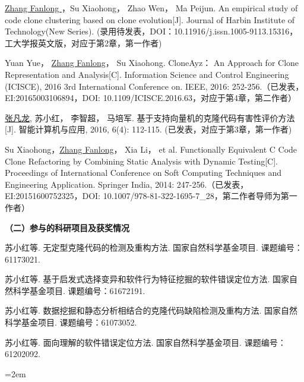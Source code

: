 \begin{publist}
\item
\underline{Zhang Fanlong }，Su Xiaohong， Zhao Wen， Ma Peijun. An empirical study of code clone clustering based on clone evolution[J]. Journal of Harbin Institute of Technology(New Series). (录用待发表，DOI：10.11916/j.issn.1005-9113.15316，工大学报英文版，对应于第2章，第一作者)

\item
Yuan Yue， \underline{Zhang Fanlong}， Su Xiaohong. CloneAyz： An Approach for Clone Representation and Analysis[C]. Information Science and Control Engineering (ICISCE), 2016 3rd International Conference on. IEEE, 2016: 252-256.（已发表，EI:20165003106894，DOI:	10.1109/ICISCE.2016.63，对应于第4章，第二作者）
\item
\underline{张凡龙}, 苏小红， 李智超， 马培军. 基于支持向量机的克隆代码有害性评价方法[J]. 智能计算机与应用, 2016, 6(4): 112-115. (已发表，对应于第3章，第一作者)

\item
Su Xiaohong，\underline{Zhang Fanlong}， Xia Li， et al. Functionally Equivalent C Code Clone Refactoring by Combining Static Analysis with Dynamic Testing[C]. Proceedings of International Conference on Soft Computing Techniques and Engineering Application. Springer India, 2014: 247-256.（已发表，EI:20151600752325，DOI: 10.1007/978-81-322-1695-7\_28，第二作者导师为第一作者）
\end{publist}




\noindent\textbf{（二）参与的科研项目及获奖情况}
\begin{publist}
\item	
苏小红等. 无定型克隆代码的检测及重构方法. 国家自然科学基金项目. 课题编号：61173021.
\item 
苏小红等. 基于启发式选择变异和软件行为特征挖掘的软件错误定位方法. 国家自然科学基金项目. 课题编号：61672191.
\item
苏小红等. 数据挖掘和静态分析相结合的克隆代码缺陷检测及重构方法. 国家自然科学基金项目. 课题编号：61073052.
\item
苏小红等. 面向理解的软件错误定位方法. 国家自然科学基金项目. 课题编号：61202092.

\end{publist}
\vfill
{}\hangindent=2em\noindent

\setlength{\parindent}{2em}
